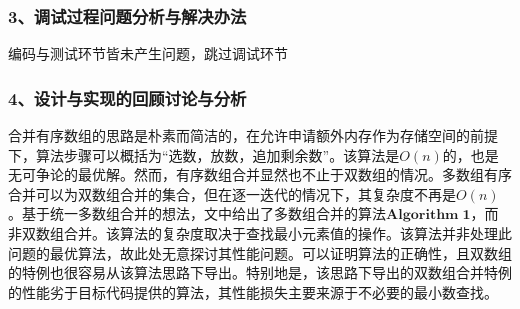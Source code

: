 \documentclass[UTF8, a4paper]{ctexart}
\begin{document}
\subsubsection*{3、调试过程问题分析与解决办法}
编码与测试环节皆未产生问题，跳过调试环节
\subsubsection*{4、设计与实现的回顾讨论与分析}
合并有序数组的思路是朴素而简洁的，在允许申请额外内存作为存储空间的前提下，算法步骤可以概括为“选数，放数，追加剩余数”。该算法是$O(n)$的，也是无可争论的最优解。然而，有序数组合并显然也不止于双数组的情况。多数组有序合并可以为双数组合并的集合，但在逐一迭代的情况下，其复杂度不再是$O(n)$。基于统一多数组合并的想法，文中给出了多数组合并的算法$\mathbf{Algorithm\;1}$，而非双数组合并。该算法的复杂度取决于查找最小元素值的操作。该算法并非处理此问题的最优算法，故此处无意探讨其性能问题。可以证明算法的正确性，且双数组的特例也很容易从该算法思路下导出。特别地是，该思路下导出的双数组合并特例的性能劣于目标代码提供的算法，其性能损失主要来源于不必要的最小数查找。
\end{document}
